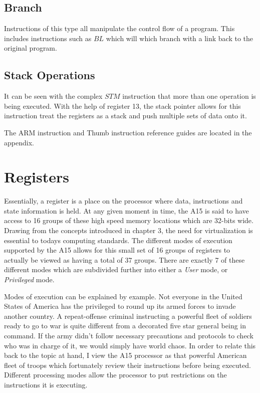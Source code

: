 \documentclass[12pt]{scrreprt}
\begin{document}
	\section{Branch}
		Instructions of this type all manipulate the control flow of a program.
		This includes instructions such as $BL$ which will which branch with a link back to the original program.
	\section{Stack Operations}
		It can be seen with the complex $STM$ instruction that more than one operation is being executed.
		With the help of register 13, the stack pointer allows for this instruction treat the registers as a stack and push multiple sets of data onto it.

	The ARM instruction and Thumb instruction reference guides are located in the appendix.

{\let\clearpage\relax\chapter{Registers}}

	Essentially, a register is a place on the processor where data, instructions and state information is held.
	At any given moment in time, the A15 is said to have access to 16 groups of these high speed memory locations which are 32-bits wide.
	Drawing from the concepts introduced in chapter 3, the need for virtualization is essential to todays computing standards.
	The different modes of execution supported by the A15 allows for this small set of 16 groups of registers to actually be viewed as having a total of 37 groups.
	There are exactly 7 of these different modes which are subdivided further into either a \textit{User} mode, or \textit{Privileged} mode.
	
	Modes of execution can be explained by example.
	Not everyone in the United States of America has the privileged to round up its armed forces to invade another country.
	A repeat-offense criminal instructing a powerful fleet of soldiers ready to go to war is quite different from a decorated five star general being in command.
	If the army didn't follow necessary precautions and protocols to check who was in charge of it, we would simply have world chaos.
	In order to relate this back to the topic at hand, I view the A15 processor as that powerful American fleet of troops which fortunately review their instructions before being executed.
	Different processing modes allow the processor to put restrictions on the instructions it is executing.
\end{document}
